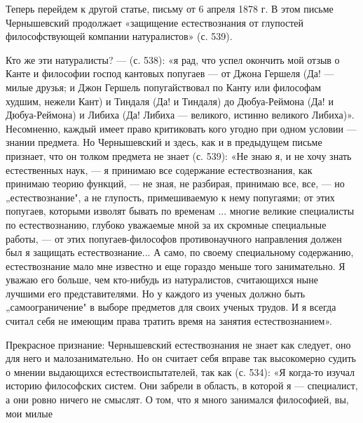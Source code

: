 Теперь перейдем к другой статье, письму от 6 апреля 1878 г. В этом письме
Чернышевский продолжает «защищение естествознания от глупостей философствующей
компании натуралистов» (с. 539).

Кто же эти натуралисты? --- (с. 538): «я рад, что успел окончить мой
отзыв о Канте и философии господ кантовых попугаев --- от Джона
Гершеля (Да! --- милые друзья; и Джон Гершель попугайствовал по Канту
или философам худшим, нежели Кант) и Тиндаля (Да! и Тиндаля) до
Дюбуа-Реймона (Да! и Дюбуа-Реймона) и Либиха (Да! Либиха --- великого,
истинно великого Либиха)». Несомненно, каждый имеет право критиковать
кого угодно при одном условии --- знании предмета. Но Чернышевский и
здесь, как и в предыдущем письме признает, что он толком предмета не
знает (с. 539): «Не знаю я, и не хочу знать естественных наук, --- я
принимаю все содержание естествознания, как принимаю теорию функций, ---
не зная, не разбирая, принимаю все, все, --- но „естествознание", а
не глупость, примешиваемую к нему попугаями; от этих попугаев,
которыми изволят бывать по временам ... многие великие специалисты по
естествознанию, глубоко уважаемые мной за их скромные специальные
работы, --- от этих попугаев-философов противонаучного направления
должен был я защищать естествознание... А само, по своему специальному
содержанию, естествознание мало мне известно и еще гораздо меньше того
занимательно. Я уважаю его больше, чем кто-нибудь из натуралистов,
считающихся ныне лучшими его представителями. Но у каждого из ученых
должно быть „самоограничение" в выборе предметов для своих ученых
трудов. И я всегда считал себя не имеющим права тратить время на
занятия естествознанием».

Прекрасное признание: Чернышевский естествознания не знает как следует, оно для
него и малозанимательно. Но он считает себя вправе так высокомерно судить о
мнении выдающихся естествоиспытателей, так как (с. 534): «Я когда-то изучал
историю философских систем. Они забрели в область, в которой я --- специалист, а
они ровно ничего не смыслят. О том, что я много занимался философией, вы, мои
милые
